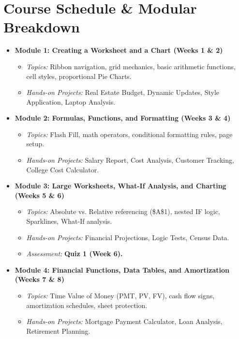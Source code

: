 \documentclass[11pt,a4paper]{article}
\begin{document}
\section*{Course Schedule \& Modular Breakdown}
\begin{itemize}[leftmargin=*]
    \item \textbf{Module 1: Creating a Worksheet and a Chart (Weeks 1 \& 2)}
    \begin{itemize}[noitemsep]
        \item \textit{Topics:} Ribbon navigation, grid mechanics, basic arithmetic functions, cell styles, proportional Pie Charts.
        \item \textit{Hands-on Projects:} Real Estate Budget, Dynamic Updates, Style Application, Laptop Analysis.
    \end{itemize}

    \item \textbf{Module 2: Formulas, Functions, and Formatting (Weeks 3 \& 4)}
    \begin{itemize}[noitemsep]
        \item \textit{Topics:} Flash Fill, math operators, conditional formatting rules, page setup.
        \item \textit{Hands-on Projects:} Salary Report, Cost Analysis, Customer Tracking, College Cost Calculator.
    \end{itemize}

    \item \textbf{Module 3: Large Worksheets, What-If Analysis, and Charting (Weeks 5 \& 6)}
    \begin{itemize}[noitemsep]
        \item \textit{Topics:} Absolute vs. Relative referencing (\$A\$1), nested IF logic, Sparklines, What-If analysis.
        \item \textit{Hands-on Projects:} Financial Projections, Logic Tests, Census Data.
        \item \textit{Assessment:} \textbf{Quiz 1 (Week 6).}
    \end{itemize}

    \item \textbf{Module 4: Financial Functions, Data Tables, and Amortization (Weeks 7 \& 8)}
    \begin{itemize}[noitemsep]
        \item \textit{Topics:} Time Value of Money (PMT, PV, FV), cash flow signs, amortization schedules, sheet protection.
        \item \textit{Hands-on Projects:} Mortgage Payment Calculator, Loan Analysis, Retirement Planning.
    \end{itemize}


\end{itemize}
\end{document}
